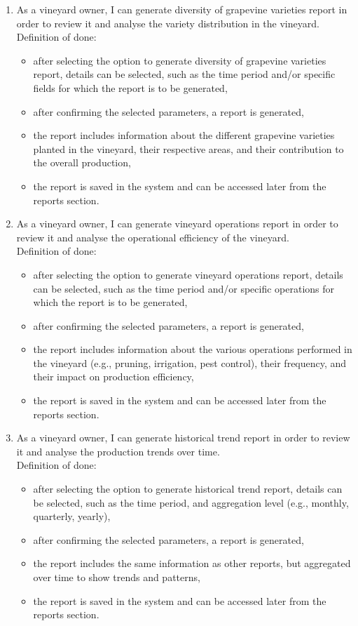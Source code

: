 \begin{enumerate}
	\item As a vineyard owner, I can generate diversity of grapevine varieties report in order to review it and analyse the variety distribution in the vineyard.
	\\Definition of done:
	\begin{itemize}
		\item after selecting the option to generate diversity of grapevine varieties report, details can be selected, such as the time period and/or specific fields for which the report is to be generated,
		\item after confirming the selected parameters, a report is generated,
		\item the report includes information about the different grapevine varieties planted in the vineyard, their respective areas, and their contribution to the overall production,
		\item the report is saved in the system and can be accessed later from the reports section.
	\end{itemize}
	\item As a vineyard owner, I can generate vineyard operations report in order to review it and analyse the operational efficiency of the vineyard.
	\\Definition of done:
	\begin{itemize}
		\item after selecting the option to generate vineyard operations report, details can be selected, such as the time period and/or specific operations for which the report is to be generated,
		\item after confirming the selected parameters, a report is generated,
		\item the report includes information about the various operations performed in the vineyard (e.g., pruning, irrigation, pest control), their frequency, and their impact on production efficiency,
		\item the report is saved in the system and can be accessed later from the reports section.
	\end{itemize}
	
	\item As a vineyard owner, I can generate historical trend report in order to review it and analyse the production trends over time.
	\\Definition of done:
	\begin{itemize}
		\item after selecting the option to generate historical trend report, details can be selected, such as the time period, and aggregation level (e.g., monthly, quarterly, yearly),
		\item after confirming the selected parameters, a report is generated,
		\item the report includes the same information as other reports, but aggregated over time to show trends and patterns,
		\item the report is saved in the system and can be accessed later from the reports section.
	\end{itemize}
	

\end{enumerate}
